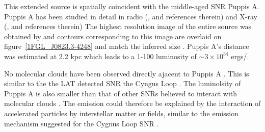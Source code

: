 \documentclass[12pt,preprint]{aastex}
\newcommand{\gev}{\text{GeV}\xspace}
\newcommand{\s}{\text{s}\xspace}
\newcommand{\rosat}{\text{{\em ROSAT}}\xspace}
\renewcommand{\approx}{\sim\!\xspace}
\begin{document}
\begin{shaded}
This extended source is spatially coincident with the middle-aged
SNR Puppis A.  Puppis A has been studied in detail in radio
(\cite{puppis_a_vla}, and references therein) and  X-ray 
(\cite{rosat_puppis_a,suzaku_puppis_a}, and references therein)
The highest resolution image of the entire source was obtained
by \rosat and contours corresponding to this
image are overlaid on figure~\ref{1FGL_J0823.3-4248} and match the
inferred \gev size \citep{rosat_puppis_a}.
Puppis A's distance was estimated at 2.2 kpc \citep{reynoso_1995,reynoso_2003}
which leads to a 1-100 \gev luminosity of $\approx 3\times 10^{34}$ ergs/\s.

No molecular clouds have been observed directly ajacent to Puppis A 
\citep{co_eastern_puppis_a}.
This is similar to the the LAT detected SNR the Cyngus Loop \citep{cygnus_loop_lat}.
The luminolsity of Puppis A is also smaller than that of 
other SNRs believed to interact with molecular clouds
\citep{w51c,ic443,w44,w28,w49b_lat}.
The \gev emission could therefore be explained by the interaction
of accelerated particles by interstellar matter or fields, similar
to the emission mechanism suggested for the Cygnus Loop SNR
\citep{cygnus_loop_lat}.
\end{shaded}


%
    
\end{document}
